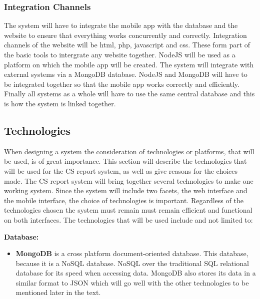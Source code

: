 \documentclass{article}
\begin{document}
			\subsubsection{Integration Channels}
				The system will have to integrate the mobile app with the database and the website to ensure that everything works concurrently and correctly. Integration channels of the website will be html, php, javascript and css. These form part of the basic tools to intergrate any website together. NodeJS will be used as a platform on which the mobile app will be created. The system will integrate with external systems via a MongoDB database. NodeJS and MongoDB will have to be integrated together so that the mobile app works correctly and efficiently. Finally all systems as a whole will have to use the same central database and this is how the system is linked together.   

		\subsection{Technologies}
		When designing a system the consideration of technologies or platforms, that will be used, is of great importance. This section will describe the technologies that will be used for the CS report system, as well as give reasons for the choices made. The CS report system will bring together several technologies to make one working system. Since the system will include two facets, the web interface and the mobile interface, the choice of technologies is important. Regardless of the technologies chosen the system must remain must remain efficient and functional on both interfaces. The technologies that will be used include and not limited to:
		
		 \textbf{Database:}\par
		 \begin{itemize}
		\item  \textbf{MongoDB} is a cross platform document-oriented database. This database, because it is a NoSQL database. NoSQL over the traditional SQL relational database for its speed when accessing data. MongoDB also stores its data in a similar format to JSON which will go well with the other technologies to be mentioned later in the text.
		\end{itemize}
		
\end{document}
